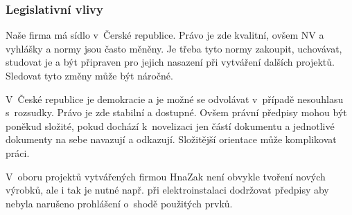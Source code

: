 \documentclass[a4paper, twoside, 11pt]{article}
\begin{document}
		\subsubsection{Legislativní vlivy}
			Naše firma má sídlo v~Čerské republice. Právo je zde kvalitní, ovšem NV a vyhlášky a normy jsou často měněny. Je třeba tyto normy zakoupit, uchovávat, studovat je a být připraven pro jejich nasazení při vytváření dalších projektů. Sledovat tyto změny může být náročné. \par
			V~České republice je demokracie a je možné se odvolávat v~případě nesouhlasu s~rozsudky. Právo je zde stabilní a dostupné. Ovšem právní předpisy mohou být poněkud složité, pokud dochází k~novelizaci jen částí dokumentu a jednotlivé dokumenty na sebe navazují a odkazují. Složitější orientace může komplikovat práci.\par
			V~oboru projektů vytvářených firmou HnaZak není obvykle tvoření nových výrobků, ale i tak je nutné např. při elektroinstalaci dodržovat předpisy aby nebyla narušeno prohlášení o~shodě použitých prvků.


	
\end{document}
